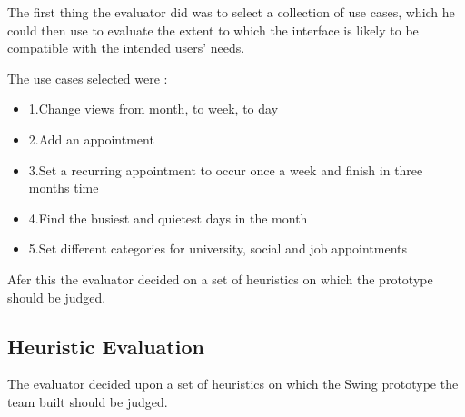 \documentclass{article}
\begin{document}
The first thing the evaluator did was to select a collection of use cases, which he could then use to evaluate the extent to which the interface is likely to be compatible with the intended users’ needs. 

The use cases selected were : 
\begin{itemize}
\item 1.Change views from month, to week, to day 
\item 2.Add an appointment 
\item 3.Set a recurring appointment to occur once a week and finish in three months time
\item 4.Find the busiest and quietest days in the month
\item 5.Set different categories for university, social and job appointments
\end{itemize}

Afer this the evaluator decided on a set of heuristics on which the prototype should be judged. 

\subsection{Heuristic Evaluation}

The evaluator decided upon a set of heuristics on which the Swing prototype the team built should be judged.
\end{document}
